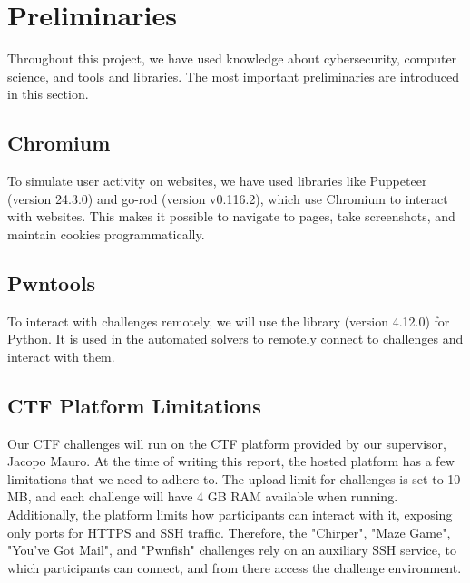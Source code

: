 \section{Preliminaries}\label{sec:preliminaries}


Throughout this project, we have used knowledge about cybersecurity, computer science, and tools and libraries. The most important preliminaries are introduced in this section.

\subsection{Chromium}

To simulate user activity on websites, we have used libraries like Puppeteer\cite{github__puppeteer} (version 24.3.0) and go-rod\cite{github__go_rod} (version v0.116.2), which use Chromium\cite{chromium} to interact with websites. This makes it possible to navigate to pages, take screenshots, and maintain cookies programmatically.

\subsection{Pwntools}
To interact with challenges remotely, we will use the \cite{github__pwntools} library (version 4.12.0) for Python. It is used in the automated solvers to remotely connect to challenges and interact with them.

\subsection{CTF Platform Limitations}
Our CTF challenges will run on the CTF platform\cite{ctf_platform} provided by our supervisor, Jacopo Mauro. At the time of writing this report, the hosted platform has a few limitations that we need to adhere to. The upload limit for challenges is set to 10 MB, and each challenge will have 4 GB RAM available when running. Additionally, the platform limits how participants can interact with it, exposing only ports for HTTPS and SSH traffic. Therefore, the "Chirper", "Maze Game", "You've Got Mail", and "Pwnfish" challenges rely on an auxiliary SSH service, to which participants can connect, and from there access the challenge environment.


